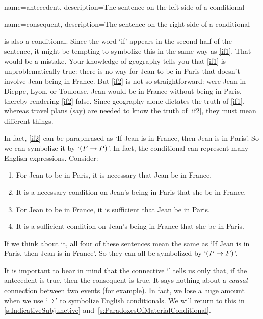 {
name=antecedent,
description={The sentence on the left side of a \gls{conditional}}
}


{
name=consequent,
description={The sentence on the right side of a \gls{conditional}}
}

 is also a conditional. Since the word `if' appears in the second half of the sentence, it might be tempting to symbolize this in the same way as \cref*{if1}. That would be a mistake. Your knowledge of geography tells you that \cref*{if1} is unproblematically true: there is no way for Jean to be in Paris that doesn't involve Jean being in France. But \cref*{if2} is not so straightforward: were  Jean in Dieppe, Lyon, or Toulouse, Jean would be in France without being in Paris, thereby rendering \cref*{if2} false. Since geography alone dictates the truth of \cref*{if1}, whereas travel plans (say) are needed to know the truth of \cref*{if2}, they must mean different things.

In fact, \cref*{if2} can be paraphrased as `If Jean is in France, then Jean is in Paris'. So we can symbolize it by `$(F \rightarrow P)$'.
\noindent In fact, the conditional can represent many English expressions. Consider: 	\begin{enumerate}
		\item\label{ifnec1} For Jean to be in Paris, it is necessary that Jean be in France.
		\item\label{ifnec2} It is a necessary condition on Jean's being in Paris that she be in France.
		\item\label{ifsuf1} For Jean to be in France, it is sufficient that Jean be in Paris.
		\item\label{ifsuf2} It is a sufficient condition on Jean's being in France that she be in Paris.
	\end{enumerate}
If we think about it, all four of these sentences mean the same as  `If Jean is in Paris, then Jean is in France'. So they can all be symbolized by `$(P \rightarrow F)$'.

It is important to bear in mind that the connective `\eif' tells us only that, if the antecedent is true, then the consequent is true. It says nothing about a \emph{causal} connection between two events (for example). In fact, we lose a huge amount when we use `$\rightarrow$' to symbolize English conditionals. We will return to this in \cref{s:IndicativeSubjunctive} and~\cref{s:ParadoxesOfMaterialConditional}.

